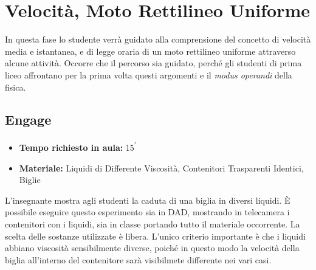\documentclass{report} \usepackage[T1]{fontenc} \usepackage[italian]{babel}
\begin{document}
\chapter{Velocità, Moto Rettilineo Uniforme}\label{velocità}
In questa fase lo studente verrà guidato alla comprensione del concetto di
velocità media e istantanea, e di legge oraria di un moto rettilineo
uniforme attraverso alcune attività. Occorre che il percorso sia guidato, perché
gli studenti di prima liceo affrontano per la prima volta questi argomenti e
il \emph{modus operandi} della fisica.

\section{Engage}\label{velocità_engage}

\begin{itemize}
\item \textbf{Tempo richiesto in aula:} 15\textsuperscript{$\prime$}
\item \textbf{Materiale:} Liquidi di Differente Viscosità, Contenitori Trasparenti Identici, Biglie
\end{itemize}

L’insegnante mostra agli studenti la caduta di una biglia in diversi liquidi. \`E
possibile eseguire questo esperimento sia in DAD, mostrando in telecamera i
contenitori con i liquidi, sia in classe portando tutto il materiale
occorrente. La scelta delle sostanze utilizzate è libera. L’unico criterio importante è
che i liquidi abbiano viscosità sensibilmente diverse, poiché in questo modo la velocità
della biglia all'interno del contenitore sarà visibilmete differente nei vari casi.
\end{document}
